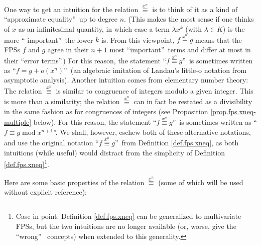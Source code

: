 One way to get an intuition for the relation $\overset{x^{n}}{\equiv}$ is to
think of it as a kind of \textquotedblleft approximate
equality\textquotedblright\ up to degree $n$. (This makes the most sense if
one thinks of $x$ as an infinitesimal quantity, in which case a term $\lambda
x^{k}$ (with $\lambda\in K$) is the more \textquotedblleft
important\textquotedblright\ the lower $k$ is. From this viewpoint,
$f\overset{x^{n}}{\equiv}g$ means that the FPSs $f$ and $g$ agree in their
$n+1$ most \textquotedblleft important\textquotedblright\ terms and differ at
most in their \textquotedblleft error terms\textquotedblright.) For this
reason, the statement \textquotedblleft$f\overset{x^{n}}{\equiv}%
g$\textquotedblright\ is sometimes written as \textquotedblleft$f=g+o\left(
x^{n}\right)  $\textquotedblright\ (an algebraic imitation of Landau's
little-o notation from asymptotic analysis). Another intuition comes from
elementary number theory: The relation $\overset{x^{n}}{\equiv}$ is similar to
congruence of integers modulo a given integer. This is more than a similarity;
the relation $\overset{x^{n}}{\equiv}$ can in fact be restated as a
divisibility in the same fashion as for congruences of integers (see
Proposition \ref{prop.fps.xneq-multiple} below). For this reason, the
statement \textquotedblleft$f\overset{x^{n}}{\equiv}g$\textquotedblright\ is
sometimes written as \textquotedblleft$f\equiv g\operatorname{mod}x^{n+1}%
$\textquotedblright. We shall, however, eschew both of these alternative
notations, and use the original notation \textquotedblleft$f\overset{x^{n}%
}{\equiv}g$\textquotedblright\ from Definition \ref{def.fps.xneq}, as both
intuitions (while useful) would distract from the simplicity of Definition
\ref{def.fps.xneq}\footnote{Case in point: Definition \ref{def.fps.xneq} can
be generalized to multivariate FPSs, but the two intuitions are no longer
available (or, worse, give the \textquotedblleft wrong\textquotedblright%
\ concepts) when extended to this generality.}.

Here are some basic properties of the relation $\overset{x^{n}}{\equiv}$ (some
of which will be used without explicit reference):

